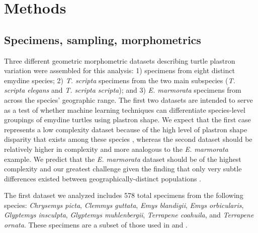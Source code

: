 \documentclass[11pt]{article}
\begin{document}
\section*{Methods}
\subsection*{Specimens, sampling, morphometrics}


Three different geometric morphometric datasets describing turtle plastron variation were assembled for this analysis: 1) specimens from eight distinct emydine species; 2) \textit{T. scripta} specimens from the two main subspecies (\textit{T. scripta elegans} and \textit{T. scripta scripta}); and 3) \textit{E. marmorata} specimens from across the species' geographic range. The first two datasets are intended to serve as a test of whether machine learning techniques can differentiate species-level groupings of emydine turtles using plastron shape. We expect that the first case represents a low complexity dataset because of the high level of plastron shape disparity that exists among these species \citep{Claude2003a,Claude2006,Angielczyk2011}, whereas the second dataset should be relatively higher in complexity and more analogous to the \textit{E. marmorata} example. We predict that the \textit{E. marmorata} dataset should be of the highest complexity and our greatest challenge given the finding that only very subtle differences existed between geographically-distinct populations \citep{Holland1992}.

The first dataset we analyzed includes 578 total specimens from the following species: \textit{Chrysemys picta}, \textit{Clemmys guttata}, \textit{Emys blandigii}, \textit{Emys orbicularis}, \textit{Glyptemys insculpta}, \textit{Glyptemys muhlenbergii}, \textit{Terrapene coahuila}, and \textit{Terrapene ornata}. These specimens are a subset of those used in \citet{Angielczyk2011} and \citet{Angielczyk2013a}.
\end{document}
